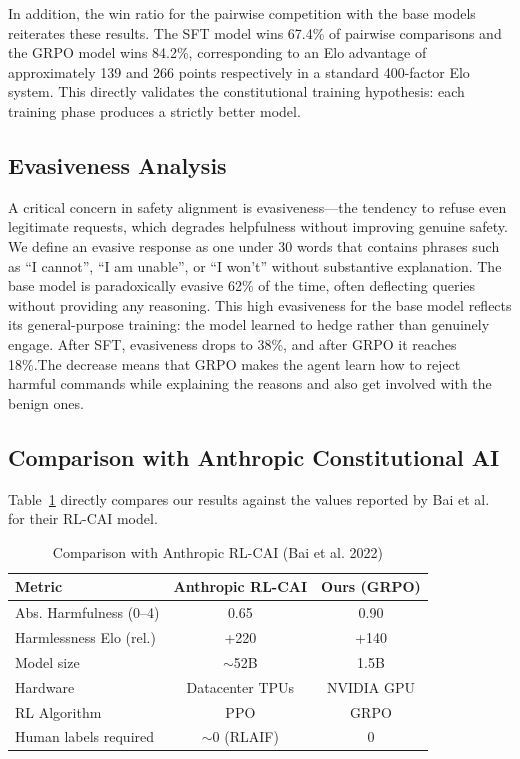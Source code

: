 \documentclass[conference]{IEEEtran}
\begin{document}
In addition, the win ratio for the pairwise competition with the base models reiterates these results. The SFT model wins 67.4\% of pairwise comparisons and the GRPO model wins 84.2\%, corresponding to an Elo advantage of approximately 139 and 266 points respectively in a standard 400-factor Elo system. This directly validates the constitutional training hypothesis: each training phase produces a strictly better model.

\subsection{Evasiveness Analysis}

A critical concern in safety alignment is evasiveness---the tendency to refuse even legitimate requests, which degrades helpfulness without improving genuine safety. We define an evasive response as one under 30 words that contains phrases such as ``I cannot'', ``I am unable'', or ``I won't'' without substantive explanation. The base model is paradoxically evasive 62\% of the time, often deflecting queries without providing any reasoning. This high evasiveness for the base model reflects its general-purpose training: the model learned to hedge rather than genuinely engage. After SFT, evasiveness drops to 38\%, and after GRPO it reaches 18\%.The decrease means that GRPO makes the agent learn how to reject harmful commands while explaining the reasons and also get involved with the benign ones.

\subsection{Comparison with Anthropic Constitutional AI}

Table~\ref{tab:comparison_anthropic} directly compares our results against the values reported by Bai et al.~\cite{bai2022constitutional} for their RL-CAI model.

\begin{table}[htbp]
\caption{Comparison with Anthropic RL-CAI (Bai et al. 2022)}
\begin{center}
\begin{tabular}{|l|c|c|}
\hline
\textbf{Metric} & \textbf{Anthropic RL-CAI} & \textbf{Ours (GRPO)} \\
\hline
Abs. Harmfulness (0--4) & 0.65 & 0.90 \\
Harmlessness Elo (rel.) & +220 & +140 \\
Model size & $\sim$52B & 1.5B \\
Hardware & Datacenter TPUs & NVIDIA GPU \\
RL Algorithm & PPO & GRPO \\
Human labels required & $\sim$0 (RLAIF) & 0 \\
\hline
\end{tabular}
\label{tab:comparison_anthropic}
\end{center}
\end{table}
\end{document}
